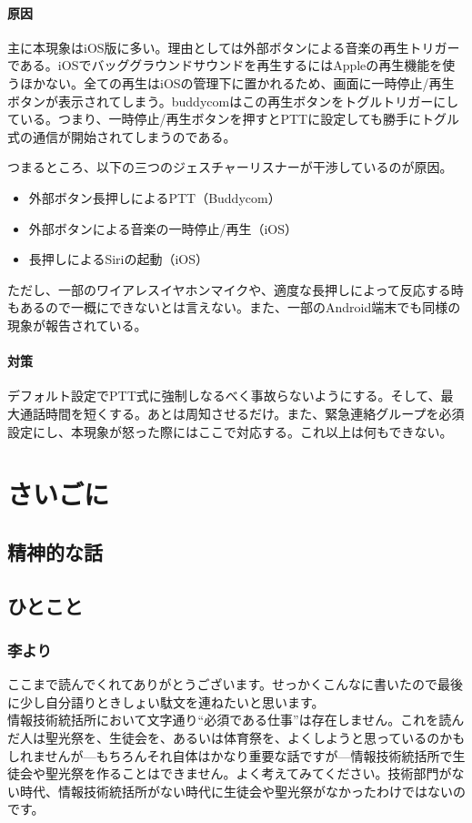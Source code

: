 \documentclass[dvipdfmx,jb5]{jreport}
\newcommand{\Chapter}[1]{\chapter{#1}\thispagestyle{fancy}}
\begin{document}
\subsubsection{原因}
主に本現象はiOS版に多い。理由としては外部ボタンによる音楽の再生トリガーである。iOSでバッググラウンドサウンドを再生するにはAppleの再生機能を使うほかない。全ての再生はiOSの管理下に置かれるため、画面に一時停止/再生ボタンが表示されてしまう。buddycomはこの再生ボタンをトグルトリガーにしている。つまり、一時停止/再生ボタンを押すとPTTに設定しても勝手にトグル式の通信が開始されてしまうのである。
\par
つまるところ、以下の三つのジェスチャーリスナーが干渉しているのが原因。
\begin{itemize}
      \item 外部ボタン長押しによるPTT（Buddycom）
      \item 外部ボタンによる音楽の一時停止/再生（iOS）
      \item 長押しによるSiriの起動（iOS）
\end{itemize}
ただし、一部のワイアレスイヤホンマイクや、適度な長押しによって反応する時もあるので一概にできないとは言えない。また、一部のAndroid端末でも同様の現象が報告されている。
\subsubsection{対策}
デフォルト設定でPTT式に強制しなるべく事故らないようにする。そして、最大通話時間を短くする。あとは周知させるだけ。また、緊急連絡グループを必須設定にし、本現象が怒った際にはここで対応する。これ以上は何もできない。

\Chapter{さいごに}
\section{精神的な話}
\section{ひとこと}
\subsection{李より}
ここまで読んでくれてありがとうございます。せっかくこんなに書いたので最後に少し自分語りときしょい駄文を連ねたいと思います。
\\

情報技術統括所において文字通り``必須である仕事''は存在しません。これを読んだ人は聖光祭を、生徒会を、あるいは体育祭を、よくしようと思っているのかもしれませんが---もちろんそれ自体はかなり重要な話ですが---情報技術統括所で生徒会や聖光祭を作ることはできません。よく考えてみてください。技術部門がない時代、情報技術統括所がない時代に生徒会や聖光祭がなかったわけではないのです。
\\
\end{document}
